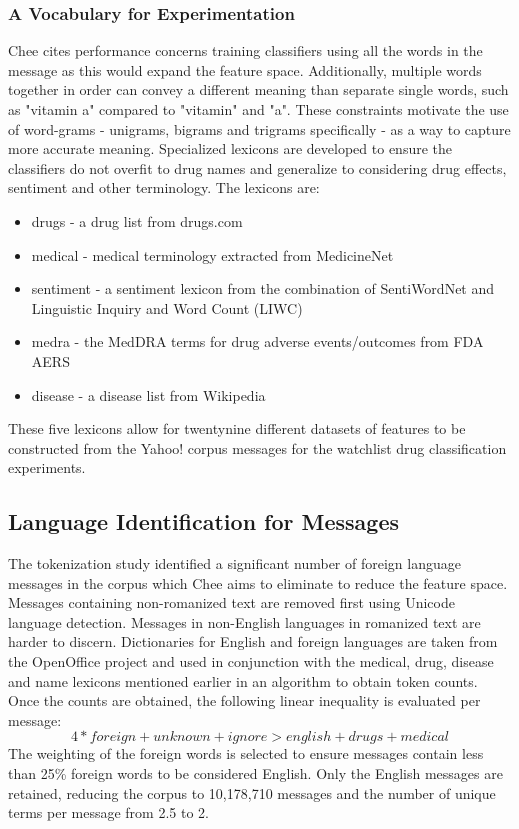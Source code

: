 \documentclass[twoside,11pt]{article}
\begin{document}
\subsubsection{A Vocabulary for Experimentation}
Chee cites performance concerns training classifiers using all the words in the message as this would expand the feature space. Additionally, multiple words together in order can convey a different meaning than separate single words, such as "vitamin a" compared to "vitamin" and "a". These constraints motivate the use of word-grams - unigrams, bigrams and trigrams specifically - as a way to capture more accurate meaning. Specialized lexicons are developed to ensure the classifiers do not overfit to drug names and generalize to considering drug effects, sentiment and other terminology. The lexicons are:
\begin{itemize}
  \item drugs - a drug list from drugs.com
  \item medical - medical terminology extracted from MedicineNet
  \item sentiment - a sentiment lexicon from the combination of SentiWordNet and Linguistic Inquiry and Word Count (LIWC)
  \item medra - the MedDRA terms for drug adverse events/outcomes from FDA AERS
  \item disease - a disease list from Wikipedia
\end{itemize}
These five lexicons allow for twentynine different datasets of features to be constructed from the Yahoo! corpus messages for the watchlist drug classification experiments. %

\subsection{Language Identification for Messages}
The tokenization study identified a significant number of foreign language messages in the corpus which Chee aims to eliminate to reduce the feature space. Messages containing non-romanized text are removed first using Unicode language detection. Messages in non-English languages in romanized text are harder to discern. Dictionaries for English and foreign languages are taken from the OpenOffice project and used in conjunction with the medical, drug, disease and name lexicons mentioned earlier in an algorithm to obtain token counts. Once the counts are obtained, the following linear inequality is evaluated per message:
\[
  4 * foreign + unknown + ignore > english + drugs + medical
\]
The weighting of the foreign words is selected to ensure messages contain less than 25\% foreign words to be considered English. Only the English messages are retained, reducing the corpus to 10,178,710 messages and the number of unique terms per message from 2.5 to 2. %
\end{document}
